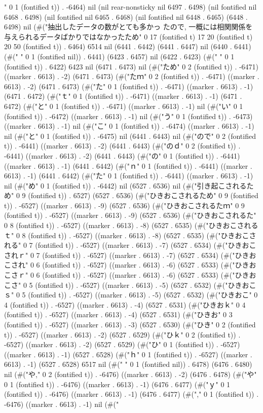 " 0 1 (fontified t)) . -6464) nil (nil rear-nonsticky nil 6497 . 6498) (nil fontified nil 6468 . 6498) (nil fontified nil 6465 . 6468) (nil fontified nil 6448 . 6465) (6448 . 6498) nil (#("抽出したデータの数がとても多かっ
たので, 一概には相関関係を与えられるデータばかりではなかったため" 0 17 (fontified t) 17 20 (fontified t) 20 50 (fontified t)) . 6464) 6514 nil (6441 . 6442) (6441 . 6447) nil (6440 . 6441) (#(" " 0 1 (fontified nil)) . 6441) (6423 . 6457) nil (6422 . 6423) (#(" " 0 1 (fontified t)) . 6422) 6423 nil (6471 . 6473) nil (#("ため" 0 2 (fontified t)) . -6471) ((marker . 6613) . -2) (6471 . 6473) (#("たｍ" 0 2 (fontified t)) . -6471) ((marker . 6613) . -2) (6471 . 6473) (#("た" 0 1 (fontified t)) . -6471) ((marker . 6613) . -1) (6471 . 6472) (#("ｔ" 0 1 (fontified t)) . -6471) ((marker . 6613) . -1) (6471 . 6472) (#("と" 0 1 (fontified t)) . -6471) ((marker . 6613) . -1) nil (#("い" 0 1 (fontified t)) . -6472) ((marker . 6613) . -1) nil (#("う" 0 1 (fontified t)) . -6473) ((marker . 6613) . -1) nil (#("こ" 0 1 (fontified t)) . -6474) ((marker . 6613) . -1) nil (#("と" 0 1 (fontified t)) . -6475) nil (6441 . 6443) nil (#("ので" 0 2 (fontified t)) . -6441) ((marker . 6613) . -2) (6441 . 6443) (#("のｄ" 0 2 (fontified t)) . -6441) ((marker . 6613) . -2) (6441 . 6443) (#("の" 0 1 (fontified t)) . -6441) ((marker . 6613) . -1) (6441 . 6442) (#("ｎ" 0 1 (fontified t)) . -6441) ((marker . 6613) . -1) (6441 . 6442) (#("た" 0 1 (fontified t)) . -6441) ((marker . 6613) . -1) nil (#("め" 0 1 (fontified t)) . -6442) nil (6527 . 6536) nil (#("引き起こされるため" 0 9 (fontified t)) . 6527) (6527 . 6536) (#("ひきおこされるため" 0 9 (fontified t)) . -6527) ((marker . 6613) . -9) (6527 . 6536) (#("ひきおこされるたｍ" 0 9 (fontified t)) . -6527) ((marker . 6613) . -9) (6527 . 6536) (#("ひきおこされるた" 0 8 (fontified t)) . -6527) ((marker . 6613) . -8) (6527 . 6535) (#("ひきおこされるｔ" 0 8 (fontified t)) . -6527) ((marker . 6613) . -8) (6527 . 6535) (#("ひきおこされる" 0 7 (fontified t)) . -6527) ((marker . 6613) . -7) (6527 . 6534) (#("ひきおこされｒ" 0 7 (fontified t)) . -6527) ((marker . 6613) . -7) (6527 . 6534) (#("ひきおこされ" 0 6 (fontified t)) . -6527) ((marker . 6613) . -6) (6527 . 6533) (#("ひきおこさｒ" 0 6 (fontified t)) . -6527) ((marker . 6613) . -6) (6527 . 6533) (#("ひきおこさ" 0 5 (fontified t)) . -6527) ((marker . 6613) . -5) (6527 . 6532) (#("ひきおこｓ" 0 5 (fontified t)) . -6527) ((marker . 6613) . -5) (6527 . 6532) (#("ひきおこ" 0 4 (fontified t)) . -6527) ((marker . 6613) . -4) (6527 . 6531) (#("ひきおｋ" 0 4 (fontified t)) . -6527) ((marker . 6613) . -4) (6527 . 6531) (#("ひきお" 0 3 (fontified t)) . -6527) ((marker . 6613) . -3) (6527 . 6530) (#("ひき" 0 2 (fontified t)) . -6527) ((marker . 6613) . -2) (6527 . 6529) (#("ひｋ" 0 2 (fontified t)) . -6527) ((marker . 6613) . -2) (6527 . 6529) (#("ひ" 0 1 (fontified t)) . -6527) ((marker . 6613) . -1) (6527 . 6528) (#("ｈ" 0 1 (fontified t)) . -6527) ((marker . 6613) . -1) (6527 . 6528) 6517 nil (#(" " 0 1 (fontified nil)) . 6478) (6476 . 6480) nil (#("や," 0 2 (fontified t)) . -6476) ((marker . 6613) . -2) (6476 . 6478) (#("や" 0 1 (fontified t)) . -6476) ((marker . 6613) . -1) (6476 . 6477) (#("ｙ" 0 1 (fontified t)) . -6476) ((marker . 6613) . -1) (6476 . 6477) (#("," 0 1 (fontified t)) . -6476) ((marker . 6613) . -1) nil (#("
